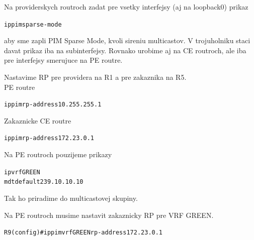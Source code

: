 \documentclass[12pt,twoside,a4paper]{report}
\begin{document}
Na providerskych routroch zadat pre vsetky interfejsy (aj na loopback0) prikaz

\noindent
{\selectfont
\begin{small}
\begin{alltt}
ip pim sparse-mode
\end{alltt}
\end{small}
}

aby sme zapli PIM Sparse Mode, kvoli sireniu multicastov. V trojuholniku staci davat prikaz iba na subinterfejsy. Rovnako urobime aj na CE routroch, ale iba pre interfejsy smerujuce na PE routre.






Nastavime RP pre providera na R1 a pre zakaznika na R5.\\
PE routre
\noindent
{\selectfont
\begin{small}
\begin{alltt}
ip pim rp-address 10.255.255.1
\end{alltt}
\end{small}
}

Zakaznicke CE routre
\noindent
{\selectfont
\begin{small}
\begin{alltt}
ip pim rp-address 172.23.0.1
\end{alltt}
\end{small}
}



Na PE routroch pouzijeme prikazy

\noindent
{\selectfont
\begin{small}
\begin{alltt}
ip vrf GREEN
  mdt default 239.10.10.10
\end{alltt}
\end{small}
}

Tak ho priradime do multicastovej skupiny.






Na PE routroch musime nastavit zakaznicky RP pre VRF GREEN.

\noindent
{\selectfont
\begin{small}
\begin{alltt}
R9(config)#ip pim vrf GREEN rp-address 172.23.0.1
\end{alltt}
\end{small}
}
\end{document}
